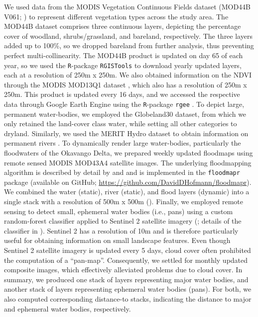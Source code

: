 \documentclass[../FinalThesis.tex]{subfiles}
\begin{document}
We used data from the MODIS Vegetation Continuous Fields dataset (MOD44B V061;
\citealp{DiMiceli.2022}) to represent different vegetation types across the
study area. The MOD44B dataset comprises three continuous layers, depicting the
percentage cover of woodland, shrubs/grassland, and bareland, respectively. The
three layers added up to 100\%, so we dropped bareland from further analysis,
thus preventing perfect multi-collinearity. The MOD44B product is updated on day
65 of each year, so we used the \texttt{R}-package \texttt{RGISTools}
\citep{Perez-Goya.2020} to download yearly updated layers, each at a resolution
of 250m x 250m. We also obtained information on the NDVI through the MODIS
MOD13Q1 dataset \citep{Didan.2015}, which also has a resolution of 250m x 250m.
This product is updated every 16 days, and we accessed the respective data
through Google Earth Engine \citep{Gorelick.2017} using the \texttt{R}-package
\texttt{rgee} \citep{Aybar.2024}. To depict large, permanent water-bodies, we
employed the Globeland30 dataset, from which we only retained the land-cover
class water, while setting all other categories to dryland. Similarly, we used
the MERIT Hydro dataset to obtain information on permanent rivers
\citep{Yamazaki.2019}. To dynamically render large water-bodies, particularly
the floodwaters of the Okavango Delta, we prepared weekly updated floodmaps
using remote sensed MODIS MOD43A4 satellite images. The underlying floodmapping
algorithm is described by detail by \citet{Wolski.2017} and \citet{Hofmann.2021}
and is implemented in the \texttt{floodmapr} package (available on GitHub;
\url{https://github.com/DavidDHofmann/floodmapr}). We combined the water
(static), river (static), and flood layers (dynamic) into a single stack with a
resolution of 500m x 500m (). Finally, we employed remote
sensing to detect small, ephemeral water bodies (i.e., pans) using a custom
random-forest classifier applied to Sentinel 2 satellite imagery
(\citealp{EuropeanSpaceAgency.2018}; details of the classifier in
). Sentinel 2 has a resolution of 10m and is therefore
particularly useful for obtaining information on small landscape features. Even
though Sentinel 2 satellite imagery is updated every 5 days, cloud cover often
prohibited the computation of a ``pan-map''. Consequently, we settled for
monthly updated composite images, which effectively alleviated problems due to
cloud cover. In summary, we produced one stack of layers representing major
water bodies, and another stack of layers representing ephemeral water bodies
(pans). For both, we also computed corresponding distance-to stacks, indicating
the distance to major and ephemeral water bodies, respectively.
\end{document}
